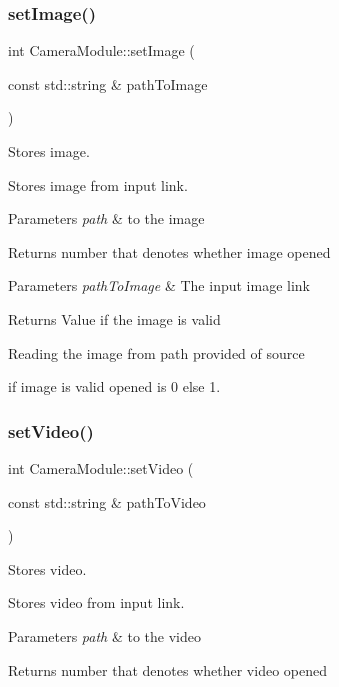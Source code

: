 \subsubsection{\texorpdfstring{set\+Image()}{setImage()}}
{\footnotesize\ttfamily int Camera\+Module\+::set\+Image (\begin{DoxyParamCaption}\item[{const std\+::string \&}]{path\+To\+Image }\end{DoxyParamCaption})}



Stores image. 

Stores image from input link.


\begin{DoxyParams}{Parameters}
{\em path} & to the image\\
\hline
\end{DoxyParams}
\begin{DoxyReturn}{Returns}
number that denotes whether image opened
\end{DoxyReturn}

\begin{DoxyParams}{Parameters}
{\em path\+To\+Image} & The input image link\\
\hline
\end{DoxyParams}
\begin{DoxyReturn}{Returns}
Value if the image is valid 
\end{DoxyReturn}
Reading the image from path provided of source

if image is valid opened is 0 else 1. \mbox{\label{class_camera_module_ae02f67a7856d9197fb27a769ed3767c5}} 
\subsubsection{\texorpdfstring{set\+Video()}{setVideo()}}
{\footnotesize\ttfamily int Camera\+Module\+::set\+Video (\begin{DoxyParamCaption}\item[{const std\+::string \&}]{path\+To\+Video }\end{DoxyParamCaption})}



Stores video. 

Stores video from input link.


\begin{DoxyParams}{Parameters}
{\em path} & to the video\\
\hline
\end{DoxyParams}
\begin{DoxyReturn}{Returns}
number that denotes whether video opened
\end{DoxyReturn}

